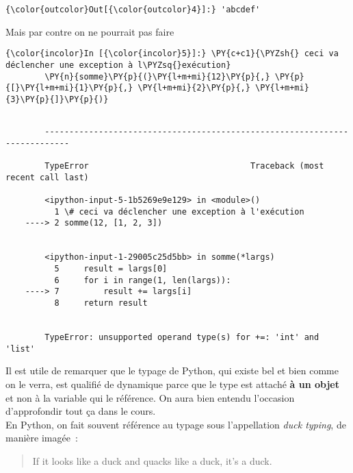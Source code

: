 \begin{Verbatim}[commandchars=\\\{\}]
{\color{outcolor}Out[{\color{outcolor}4}]:} 'abcdef'
\end{Verbatim}
            
    Mais par contre on ne pourrait pas faire

    \begin{Verbatim}[commandchars=\\\{\}]
{\color{incolor}In [{\color{incolor}5}]:} \PY{c+c1}{\PYZsh{} ceci va déclencher une exception à l\PYZsq{}exécution}
        \PY{n}{somme}\PY{p}{(}\PY{l+m+mi}{12}\PY{p}{,} \PY{p}{[}\PY{l+m+mi}{1}\PY{p}{,} \PY{l+m+mi}{2}\PY{p}{,} \PY{l+m+mi}{3}\PY{p}{]}\PY{p}{)}
\end{Verbatim}


    \begin{Verbatim}[commandchars=\\\{\}]

        ---------------------------------------------------------------------------

        TypeError                                 Traceback (most recent call last)

        <ipython-input-5-1b5269e9e129> in <module>()
          1 \# ceci va déclencher une exception à l'exécution
    ----> 2 somme(12, [1, 2, 3])
    

        <ipython-input-1-29005c25d5bb> in somme(*largs)
          5     result = largs[0]
          6     for i in range(1, len(largs)):
    ----> 7         result += largs[i]
          8     return result


        TypeError: unsupported operand type(s) for +=: 'int' and 'list'

    \end{Verbatim}

    Il est utile de remarquer que le typage de Python, qui existe bel et
bien comme on le verra, est qualifié de dynamique parce que le type est
attaché \textbf{à un objet} et non à la variable qui le référence. On
aura bien entendu l'occasion d'approfondir tout ça dans le cours.\\

    En Python, on fait souvent référence au typage sous l'appellation
\emph{duck typing}, de manière imagée~:\\

\begin{quote}
If it looks like a duck and quacks like a duck, it's a duck.\\
\end{quote}

